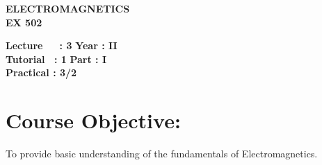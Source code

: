 \begin{center}
    \textbf{\huge{\uppercase{Electromagnetics}}}
    \\
    \vspace{.5cm}
    \textbf{\large{EX 502}}
\end{center}

\noindent\textbf{Lecture\ \ \ : 3} \hfill \textbf{Year : II } \\
\textbf{Tutorial \ : 1} \hfill \textbf{Part : I } \\
\textbf{Practical : 3/2}  \\

\par
\noindent 
\section*{Course Objective:}
To provide basic understanding of the fundamentals of Electromagnetics.

